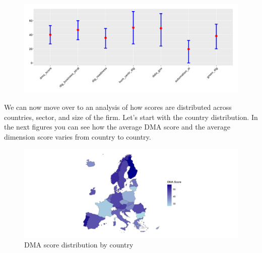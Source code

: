 \documentclass[12pt]{report}
\begin{document}
\begin{figure}[h!]
    \centering
    \includegraphics[width=\linewidth]{../Output/dma_score_quantiles.png}
    \caption{}
    \label{fig:dmascores_bydimension}
\end{figure}



\par We can now move over to an analysis of how scores are distributed across countries, sector, and size of the firm. Let's start with the country distribution. In the next figures you can see how the average DMA score and the average dimension score varies from country to country.

\begin{figure}[h!]
    \begin{center}
        \includegraphics[width=0.6\textheight,trim=225 0 225 0,clip]{../Output/map5.png}        
        \caption{DMA score distribution by country}
        \label{fig:dma_score_country_map}
    \end{center}
\end{figure}
\end{document}
